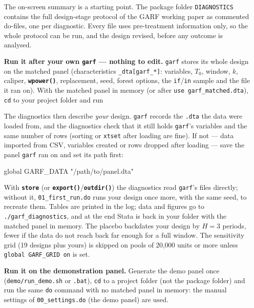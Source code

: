 \documentclass[11pt,a4paper]{article}
\newcommand{\opt}[1]{\texttt{\textbf{#1}}}
\newcommand{\code}[1]{\texttt{#1}}
\begin{document}
The on-screen summary is a starting point. The package folder \code{DIAGNOSTICS} contains the
full design-stage protocol of the GARF working paper as commented do-files, one per diagnostic.
Every file uses pre-treatment information only, so the whole protocol can be run, and the design
revised, before any outcome is analysed.

\medskip
\noindent\textbf{Run it after your own \code{garf} --- nothing to edit.} \code{garf} stores its whole
design on the matched panel (characteristics \code{\_dta[garf\_*]}: variables, $T_0$, window, $k$,
caliper, \opt{wpower()}, replacement, seed, forest options, the \code{if}/\code{in} sample and the
file it ran on). With the matched panel in memory (or after \code{use garf\_matched.dta}),
\code{cd} to your project folder and run
The diagnostics then describe \emph{your} design. \code{garf} records the \code{.dta} the data were
loaded from, and the diagnostics check that it still holds \code{garf}'s variables and the same
number of rows (sorting or \code{xtset} after loading are fine). If not --- data imported from CSV,
variables created or rows dropped after loading --- save the panel \code{garf} ran on and set its
path first:
\begin{stata}
global GARF_DATA "/path/to/panel.dta"
\end{stata}
\noindent With \opt{store}
(or \opt{export()}/\opt{outdir()}) the diagnostics read \code{garf}'s files directly; without it,
\code{01\_first\_run.do} runs your design once more, with the same seed, to recreate them.
Tables are printed in the log; data and figures go to \code{./garf\_diagnostics}, and at the end
Stata is back in your folder with the matched panel in memory. The placebo backdates your design
by $H=3$ periods, fewer if the data do not reach back far enough for a full window. The
sensitivity grid (19 designs plus yours) is skipped on pools of 20{,}000 units or more unless
\code{global GARF\_GRID on} is set.

\medskip
\noindent\textbf{Run it on the demonstration panel.} Generate the demo panel once
(\code{demo/run\_demo.sh} or \code{.bat}), \code{cd} to a project folder (not the package
folder) and run the same \code{do} command with no matched panel in memory: the manual settings
of \code{00\_settings.do} (the demo panel) are used.
\end{document}
